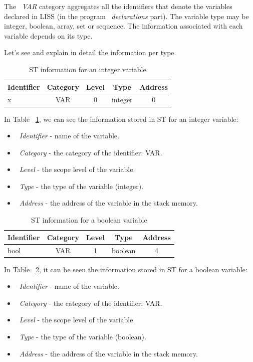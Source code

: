 \documentclass[
  oneside,
  11pt, a4paper,
  footinclude=true,
  headinclude=true,
  cleardoublepage=empty
]{scrbook}
\begin{document}
The ~\textit{VAR} category aggregates all the identifiers that denote the variables declared in LISS (in the program ~\textit{declarations} part). The variable type may be integer, boolean, array, set or sequence.
The information associated with each variable depends on its type.

Let's see and explain in detail the information per type.

\begin{table}[h!]
\centering
\caption{ST information for an integer variable}
\label{tbl:var_integer_information}
\begin{tabular}{l|c|c|c|c}
\multicolumn{1}{c|}{Identifier} & Category & Level & Type    & Address \\ \hline
x                             & VAR      & 0     & integer & 0      
\end{tabular}
\end{table}

In Table ~\ref{tbl:var_integer_information}, we can see the information stored in ST for an integer variable:
\begin{itemize}
\item ~\textit{Identifier} - name of the variable.
\item ~\textit{Category} - the category of the identifier: VAR.
\item ~\textit{Level} - the scope level of the variable.
\item ~\textit{Type} - the type of the variable (integer).
\item ~\textit{Address} - the address of the variable in the stack memory.
\end{itemize}

\newpage

\begin{table}[h!]
\centering
\caption{ST information for a boolean variable}
\label{tbl:var_boolean_information}
\begin{tabular}{l|c|c|c|c}
\multicolumn{1}{c|}{Identifier} & Category & Level & Type    & Address \\ \hline
bool                            & VAR      & 1     & boolean & 4      
\end{tabular}
\end{table}

In Table ~\ref{tbl:var_boolean_information}, it can be seen the information stored in ST for a boolean variable:

\begin{itemize}
\item ~\textit{Identifier} - name of the variable.
\item ~\textit{Category} - the category of the identifier: VAR.
\item ~\textit{Level} - the scope level of the variable.
\item ~\textit{Type} - the type of the variable (boolean).
\item ~\textit{Address} - the address of the variable in the stack memory.
\end{itemize}
\end{document}

